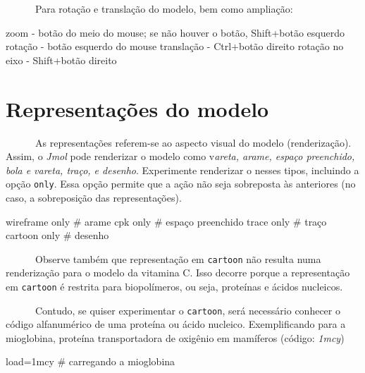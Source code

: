 \documentclass[
  letterpaper,
  DIV=11,
  numbers=noendperiod]{scrreprt}
\newenvironment{Shaded}{\begin{snugshade}}{\end{snugshade}}
\newcommand{\CommentTok}[1]{\textcolor[rgb]{0.37,0.37,0.37}{#1}}
\newcommand{\DecValTok}[1]{\textcolor[rgb]{0.68,0.00,0.00}{#1}}
\newcommand{\NormalTok}[1]{\textcolor[rgb]{0.00,0.23,0.31}{#1}}
\newcommand{\OtherTok}[1]{\textcolor[rgb]{0.00,0.23,0.31}{#1}}
\newcommand{\SpecialCharTok}[1]{\textcolor[rgb]{0.37,0.37,0.37}{#1}}
\begin{document}
~~~~~~Para rotação e translação do modelo, bem como ampliação:

\begin{Shaded}
\begin{Highlighting}[]
\NormalTok{zoom }\SpecialCharTok{{-}}\NormalTok{ botão do meio do mouse; se não houver o botão, Shift}\SpecialCharTok{+}\NormalTok{botão esquerdo}
\NormalTok{rotação }\SpecialCharTok{{-}}\NormalTok{ botão esquerdo do mouse}
\NormalTok{translação }\SpecialCharTok{{-}}\NormalTok{ Ctrl}\SpecialCharTok{+}\NormalTok{botão direito}
\NormalTok{rotação no eixo }\SpecialCharTok{{-}}\NormalTok{ Shift}\SpecialCharTok{+}\NormalTok{botão direito}
\end{Highlighting}
\end{Shaded}

\section{Representações do modelo}\label{representauxe7uxf5es-do-modelo}

~~~~~~As representações referem-se ao aspecto visual do modelo
(renderização). Assim, o \emph{Jmol} pode renderizar o modelo como
v\emph{areta, arame, espaço preenchido, bola e vareta, traço, e
desenho}. Experimente renderizar o nesses tipos, incluindo a opção
\texttt{only}. Essa opção permite que a ação não seja sobreposta às
anteriores (no caso, a sobreposição das representações).

\begin{Shaded}
\begin{Highlighting}[]
\NormalTok{wireframe only }\CommentTok{\# arame}
\NormalTok{cpk only }\CommentTok{\# espaço preenchido}
\NormalTok{trace only }\CommentTok{\# traço}
\NormalTok{cartoon only }\CommentTok{\# desenho}
\end{Highlighting}
\end{Shaded}

~~~~~~Observe também que representação em \texttt{cartoon} não resulta
numa renderização para o modelo da vitamina C. Isso decorre porque a
representação em \texttt{cartoon} é restrita para biopolímeros, ou seja,
proteínas e ácidos nucleicos.

~~~~~~Contudo, se quiser experimentar o \texttt{cartoon}, será
necessário conhecer o código alfanumérico de uma proteína ou ácido
nucleico. Exemplificando para a mioglobina, proteína transportadora de
oxigênio em mamíferos (código: \emph{1mcy})

\begin{Shaded}
\begin{Highlighting}[]
\NormalTok{load}\OtherTok{=}\DecValTok{1}\NormalTok{mcy }\CommentTok{\# carregando a mioglobina}
\end{Highlighting}
\end{Shaded}
\end{document}
